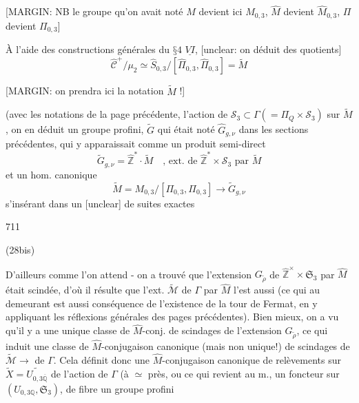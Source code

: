 [MARGIN: NB le groupe qu'on avait noté $M$ devient ici $M_{0,3}$, $\hat{M}$ devient $\hat{M}_{0,3}$, $\Pi$ devient $\Pi_{0,3}$]

À l'aide des constructions générales du $§ 4$ $\underline{VI}$, [unclear: on déduit des quotients]
$$ \hat{\mathcal{C}}^+ / \mu_2 \simeq \hat{S}_{0,3} / [\hat{\Pi}_{0,3}, \hat{\Pi}_{0,3}] = \tilde{M} $$

[MARGIN: on prendra ici la notation $\tilde{M}$ !]

(avec les notations de la page précédente, l'action de $\mathcal{S}_3 \subset \Gamma (= \Pi_Q \times \mathcal{S}_3)$ sur $\tilde{M}$, on en déduit un groupe profini, $\tilde{G}$ qui était noté $\hat{G}_{g, \nu}$ dans les sections précédentes, qui y apparaissait comme un produit semi-direct
$$ \tilde{G}_{g, \nu} = \hat{\mathbb{Z}}^* \cdot \tilde{M} \quad \text{, ext. de } \hat{\mathbb{Z}}^* \times \mathcal{S}_3 \text{ par } \tilde{M} $$
et un hom. canonique
$$ \tilde{M} = M_{0,3} / [\Pi_{0,3}, \Pi_{0,3}] \longrightarrow \tilde{G}_{g, \nu} $$
s'insérant dans un [unclear] de suites exactes

\newpage


711

(28bis)

D'ailleurs comme l'on attend - on a trouvé que
l'extension $G_{\tilde{\rho}}$ de $\hat{\mathbb{Z}}^\times \times \mathfrak{S}_3$ par $\hat{M}$ était
scindée, d'où il résulte que
l'ext. $\tilde{\mathcal{M}}$ de $\Gamma$ par $\hat{M}$ l'est aussi
(ce qui au demeurant est aussi conséquence de
l'existence de la tour de Fermat, en
y appliquant les réflexions générales
des pages précédentes). Bien mieux,
on a vu qu'il y a une unique classe
de $\hat{M}$-conj. de scindages de l'extension
$G_{\tilde{\rho}}$, ce qui induit une classe de
$\hat{M}$-conjugaison canonique (mais non
unique!) de scindages de $\tilde{\mathcal{M}} \to$ 
de $\Gamma$. Cela définit donc une
$\hat{M}$-conjugaison canonique de relèvements
sur $\tilde{X} = \widetilde{U_{0,3 \overline{\mathbb{Q}}}}$
de l'action de $\Gamma$ (à $\simeq$ près, ou ce
qui revient au m., un foncteur sur
$(U_{0,3 \mathbb{Q}}, \mathfrak{S}_3)$, de fibre un groupe profini

